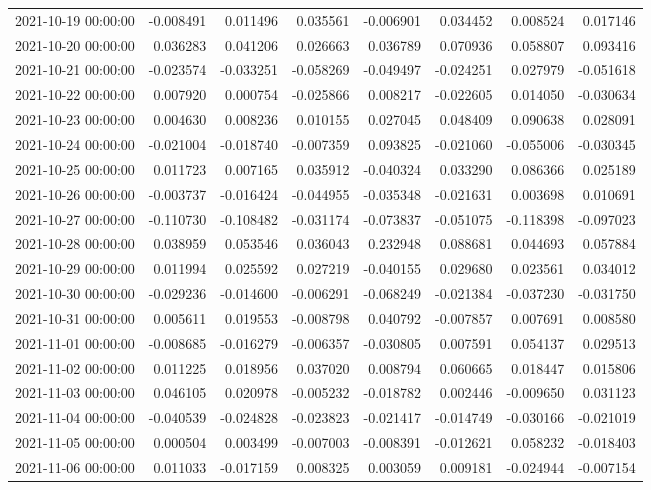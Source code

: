 \begin{tabular}{lrrrrrrr}
2021-10-19 00:00:00 & -0.008491 & 0.011496 & 0.035561 & -0.006901 & 0.034452 & 0.008524 & 0.017146 \\
2021-10-20 00:00:00 & 0.036283 & 0.041206 & 0.026663 & 0.036789 & 0.070936 & 0.058807 & 0.093416 \\
2021-10-21 00:00:00 & -0.023574 & -0.033251 & -0.058269 & -0.049497 & -0.024251 & 0.027979 & -0.051618 \\
2021-10-22 00:00:00 & 0.007920 & 0.000754 & -0.025866 & 0.008217 & -0.022605 & 0.014050 & -0.030634 \\
2021-10-23 00:00:00 & 0.004630 & 0.008236 & 0.010155 & 0.027045 & 0.048409 & 0.090638 & 0.028091 \\
2021-10-24 00:00:00 & -0.021004 & -0.018740 & -0.007359 & 0.093825 & -0.021060 & -0.055006 & -0.030345 \\
2021-10-25 00:00:00 & 0.011723 & 0.007165 & 0.035912 & -0.040324 & 0.033290 & 0.086366 & 0.025189 \\
2021-10-26 00:00:00 & -0.003737 & -0.016424 & -0.044955 & -0.035348 & -0.021631 & 0.003698 & 0.010691 \\
2021-10-27 00:00:00 & -0.110730 & -0.108482 & -0.031174 & -0.073837 & -0.051075 & -0.118398 & -0.097023 \\
2021-10-28 00:00:00 & 0.038959 & 0.053546 & 0.036043 & 0.232948 & 0.088681 & 0.044693 & 0.057884 \\
2021-10-29 00:00:00 & 0.011994 & 0.025592 & 0.027219 & -0.040155 & 0.029680 & 0.023561 & 0.034012 \\
2021-10-30 00:00:00 & -0.029236 & -0.014600 & -0.006291 & -0.068249 & -0.021384 & -0.037230 & -0.031750 \\
2021-10-31 00:00:00 & 0.005611 & 0.019553 & -0.008798 & 0.040792 & -0.007857 & 0.007691 & 0.008580 \\
2021-11-01 00:00:00 & -0.008685 & -0.016279 & -0.006357 & -0.030805 & 0.007591 & 0.054137 & 0.029513 \\
2021-11-02 00:00:00 & 0.011225 & 0.018956 & 0.037020 & 0.008794 & 0.060665 & 0.018447 & 0.015806 \\
2021-11-03 00:00:00 & 0.046105 & 0.020978 & -0.005232 & -0.018782 & 0.002446 & -0.009650 & 0.031123 \\
2021-11-04 00:00:00 & -0.040539 & -0.024828 & -0.023823 & -0.021417 & -0.014749 & -0.030166 & -0.021019 \\
2021-11-05 00:00:00 & 0.000504 & 0.003499 & -0.007003 & -0.008391 & -0.012621 & 0.058232 & -0.018403 \\
2021-11-06 00:00:00 & 0.011033 & -0.017159 & 0.008325 & 0.003059 & 0.009181 & -0.024944 & -0.007154 \\

\end{tabular}
